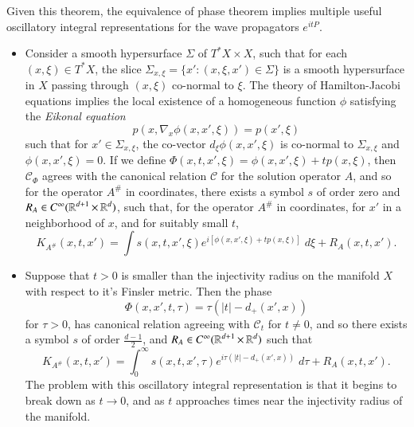 Given this theorem, the equivalence of phase theorem implies multiple useful oscillatory integral representations for the wave propagators $e^{i t P}$.
\begin{itemize}
  \item Consider a smooth hypersurface $\Sigma$ of $T^* X \times X$, such that for each $(x,\xi) \in T^* X$, the slice $\Sigma_{x,\xi} = \{ x' : (x,\xi,x') \in \Sigma \}$ is a smooth hypersurface in $X$ passing through $(x,\xi)$ co-normal to $\xi$. The theory of Hamilton-Jacobi equations implies the local existence of a homogeneous function $\phi$ satisfying the \emph{Eikonal equation}
  \begin{equation} \label{awiodjawoidhjioq23412341234234}
    p(x, \nabla_x \phi(x,x',\xi)) = p(x',\xi)
  \end{equation}
  such that for $x' \in \Sigma_{x,\xi}$, the co-vector $d_\xi \phi(x,x',\xi)$ is co-normal to $\Sigma_{x,\xi}$ and $\phi(x,x',\xi) = 0$. If we define $\Phi(x,t,x',\xi) = \phi(x,x',\xi) + t p(x,\xi)$, then $\mathcal{C}_\Phi$ agrees with the canonical relation $\mathcal{C}$ for the solution operator $A$, and so for the operator $A^\#$ in coordinates, there exists a symbol $s$ of order zero and $R_A \in C^\infty(\operatorname{\mathbb{R}}^{d+1} \times \operatorname{\mathbb{R}}^d)$, such that, for the operator $A^\#$ in coordinates, for $x'$ in a neighborhood of $x$, and for suitably small $t$,
  \begin{equation} K_{A^\#}(x,t,x') = \int s(x,t,x',\xi) e^{i [ \phi(x,x',\xi) + t p(x,\xi) ]}\; d \xi + R_A(x,t,x'). \end{equation}

  \item Suppose that $t > 0$ is smaller than the injectivity radius on the manifold $X$ with respect to it's Finsler metric. Then the phase 
  \begin{equation} \label{onedwavephase}
    \Phi(x,x',t,\tau) = \tau ( |t| - d_+(x',x) )
  \end{equation}
  for $\tau > 0$, has canonical relation agreeing with $\mathcal{C}_t$ for $t \neq 0$, and so there exists a symbol $s$ of order $\tfrac{d-1}{2}$, and $R_A \in C^\infty(\operatorname{\mathbb{R}}^{d+1} \times \operatorname{\mathbb{R}}^d)$ such that
  \begin{equation}
    K_{A^\#}(x,t,x') = \int_0^\infty s(x,t,x',\tau) e^{i \tau ( |t| - d_+(x',x) )}\; d\tau + R_A(x,t,x').
  \end{equation}
  The problem with this oscillatory integral representation is that it begins to break down as $t \to 0$, and as $t$ approaches times near the injectivity radius of the manifold.


\end{itemize}
